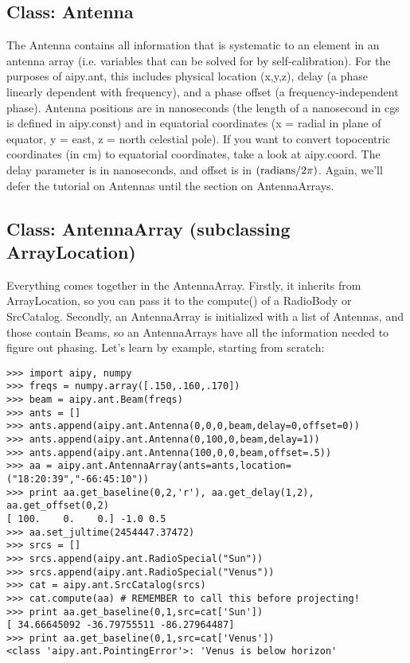 \subsection{Class: Antenna}

The Antenna contains all information that is systematic to an element in
an antenna array (i.e. variables that can be solved for by self-calibration).
For the purposes of aipy.ant, this includes physical location (x,y,z),
delay (a phase linearly dependent with frequency), and a phase offset 
(a frequency-independent phase).  Antenna positions are in
nanoseconds (the length of a nanosecond in cgs is defined in aipy.const)
and in equatorial coordinates (x = radial in plane of equator,
y = east, z = north celestial pole).  If you want to convert topocentric
coordinates (in cm) to equatorial coordinates, take a look at aipy.coord.
The delay parameter is in nanoseconds, and offset is in 
$({\rm radians}/2\pi)$.  Again, we'll
defer the tutorial on Antennas until the section on AntennaArrays.

\subsection{Class: AntennaArray (subclassing ArrayLocation)}

Everything comes together in the AntennaArray.  Firstly, it inherits from
ArrayLocation, so you can pass it to the compute() of a RadioBody or
SrcCatalog.  Secondly, an AntennaArray is initialized with a list of
Antennas, and those contain Beams, so an AntennaArrays have all the information
needed to figure out phasing.  Let's learn by example, starting from scratch:

\begin{verbatim}
>>> import aipy, numpy
>>> freqs = numpy.array([.150,.160,.170])
>>> beam = aipy.ant.Beam(freqs)
>>> ants = []
>>> ants.append(aipy.ant.Antenna(0,0,0,beam,delay=0,offset=0))
>>> ants.append(aipy.ant.Antenna(0,100,0,beam,delay=1))
>>> ants.append(aipy.ant.Antenna(100,0,0,beam,offset=.5))
>>> aa = aipy.ant.AntennaArray(ants=ants,location=("18:20:39","-66:45:10"))
>>> print aa.get_baseline(0,2,'r'), aa.get_delay(1,2), aa.get_offset(0,2)
[ 100.    0.    0.] -1.0 0.5
>>> aa.set_jultime(2454447.37472)
>>> srcs = []
>>> srcs.append(aipy.ant.RadioSpecial("Sun"))
>>> srcs.append(aipy.ant.RadioSpecial("Venus"))
>>> cat = aipy.ant.SrcCatalog(srcs)
>>> cat.compute(aa) # REMEMBER to call this before projecting!
>>> print aa.get_baseline(0,1,src=cat['Sun'])
[ 34.66645092 -36.79755511 -86.27964487]
>>> print aa.get_baseline(0,1,src=cat['Venus'])
<class 'aipy.ant.PointingError'>: 'Venus is below horizon'
\end{verbatim}

